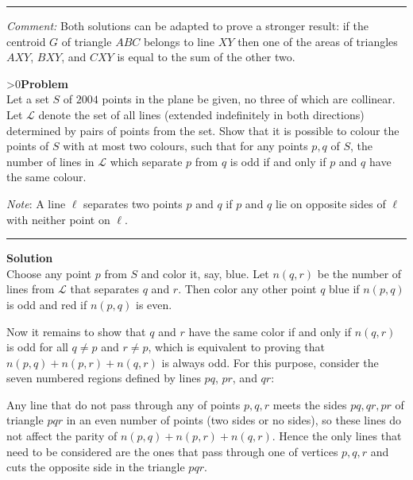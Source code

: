 \documentclass[12pt,oneside,a4paper]{book}
\newcounter{probnum}
\newcounter{solnum}
\newcommand{\prob}{\ifnum\value{probnum}>0\newpage\fi\setcounter{solnum}{0}\stepcounter{probnum}\textbf{Problem \theprobnum}\\}
\newcommand{\comment}{\medskip\hrule\medbreak\emph{Comment: }}
\newcommand{\sol}{\medskip\hrule\medbreak\textbf{Solution}\\}
\newcommand*\circled[1]{\tikz[baseline=(char.base)]{
            \node[shape=circle,draw,inner sep=2pt] (char) {#1};}}
\begin{document}
\comment
Both solutions can be adapted to prove a stronger result: if the centroid $G$ of triangle $ABC$ belongs to line $XY$ then one of the areas of triangles $AXY$, $BXY$, and $CXY$ is equal to the sum of the other two.

\prob Let a set $S$ of $2004$ points in the plane be given, no three of which are collinear. Let $\mathcal{L}$ denote the set of all lines (extended indefinitely in both directions) determined by pairs of points from the set. Show that it is possible to colour the points of $S$ with at most two colours, such that for any points $p,q$ of $S$, the number of lines in $\mathcal{L}$ which separate $p$ from $q$ is odd if and only if $p$ and $q$ have the same colour.

\emph{Note}: A line $\ell$ separates two points $p$ and $q$ if $p$ and $q$ lie on opposite sides of $\ell$ with neither point on $\ell$.

\sol Choose any point $p$ from $S$ and color it, say, blue. Let $n(q,r)$ be the number of lines from $\mathcal{L}$ that separates $q$ and $r$. Then color any other point $q$ blue if $n(p,q)$ is odd and red if $n(p,q)$ is even.

Now it remains to show that $q$ and $r$ have the same color if and only if $n(q,r)$ is odd for all $q\ne p$ and $r\ne p$, which is equivalent to proving that $n(p,q) + n(p,r) + n(q,r)$ is always odd. For this purpose, consider the seven numbered regions defined by lines $pq$, $pr$, and $qr$:
\begin{center}
\end{center} 

Any line that do not pass through any of points $p,q,r$ meets the sides $pq,qr,pr$ of triangle $pqr$ in an even number of points (two sides or no sides), so these lines do not affect the parity of $n(p,q) + n(p,r) + n(q,r)$. Hence the only lines that need to be considered are the ones that pass through one of vertices $p,q,r$ and cuts the opposite side in the triangle $pqr$.
\end{document}
